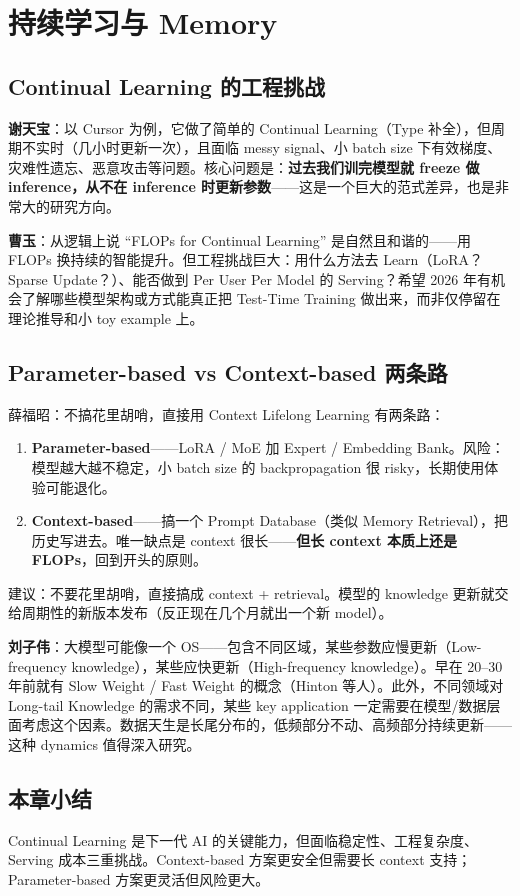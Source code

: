 \section{持续学习与 Memory}

\subsection{Continual Learning 的工程挑战}

\textbf{谢天宝}：以 Cursor 为例，它做了简单的 Continual Learning（Type 补全），但周期不实时（几小时更新一次），且面临 messy signal、小 batch size 下有效梯度、灾难性遗忘、恶意攻击等问题。核心问题是：\textbf{过去我们训完模型就 freeze 做 inference，从不在 inference 时更新参数}——这是一个巨大的范式差异，也是非常大的研究方向。

\textbf{曹玉}：从逻辑上说 ``FLOPs for Continual Learning'' 是自然且和谐的——用 FLOPs 换持续的智能提升。但工程挑战巨大：用什么方法去 Learn（LoRA？Sparse Update？）、能否做到 Per User Per Model 的 Serving？希望 2026 年有机会了解哪些模型架构或方式能真正把 Test-Time Training 做出来，而非仅停留在理论推导和小 toy example 上。

\subsection{Parameter-based vs Context-based 两条路}

\begin{knowledgebox}{薛福昭：不搞花里胡哨，直接用 Context}
Lifelong Learning 有两条路：
\begin{enumerate}
  \item \textbf{Parameter-based}——LoRA / MoE 加 Expert / Embedding Bank。风险：模型越大越不稳定，小 batch size 的 backpropagation 很 risky，长期使用体验可能退化。
  \item \textbf{Context-based}——搞一个 Prompt Database（类似 Memory Retrieval），把历史写进去。唯一缺点是 context 很长——\textbf{但长 context 本质上还是 FLOPs}，回到开头的原则。
\end{enumerate}
建议：不要花里胡哨，直接搞成 context + retrieval。模型的 knowledge 更新就交给周期性的新版本发布（反正现在几个月就出一个新 model）。
\end{knowledgebox}

\textbf{刘子伟}：大模型可能像一个 OS——包含不同区域，某些参数应慢更新（Low-frequency knowledge），某些应快更新（High-frequency knowledge）。早在 20--30 年前就有 Slow Weight / Fast Weight 的概念（Hinton 等人）。此外，不同领域对 Long-tail Knowledge 的需求不同，某些 key application 一定需要在模型/数据层面考虑这个因素。数据天生是长尾分布的，低频部分不动、高频部分持续更新——这种 dynamics 值得深入研究。

\subsection{本章小结}
Continual Learning 是下一代 AI 的关键能力，但面临稳定性、工程复杂度、Serving 成本三重挑战。Context-based 方案更安全但需要长 context 支持；Parameter-based 方案更灵活但风险更大。

